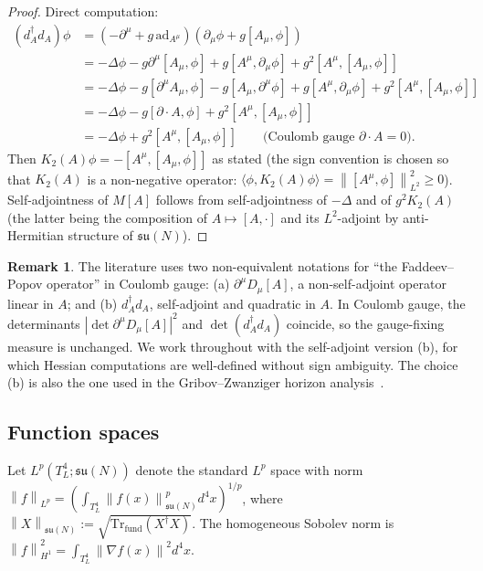 \documentclass[11pt,a4paper]{amsart}
\theoremstyle{definition}
\newtheorem{remark}[theorem]{Remark}
\newcommand{\su}{\mathfrak{su}}
\newcommand{\norm}[1]{\left\lVert#1\right\rVert}
\newcommand{\abs}[1]{\left\lvert#1\right\rvert}
\newcommand{\Tr}{\mathrm{Tr}}
\newcommand{\ad}{\mathrm{ad}}
\begin{document}
\begin{proof}
Direct computation:
\begin{align*}
(d_A^\dagger d_A)\phi &= (-\partial^\mu + g\,\ad_{A^\mu})(\partial_\mu \phi + g[A_\mu, \phi]) \\
&= -\Delta \phi - g \partial^\mu[A_\mu, \phi] + g[A^\mu, \partial_\mu\phi] + g^2 [A^\mu, [A_\mu, \phi]] \\
&= -\Delta \phi - g[\partial^\mu A_\mu, \phi] - g[A_\mu, \partial^\mu \phi] + g[A^\mu, \partial_\mu \phi] + g^2[A^\mu, [A_\mu, \phi]] \\
&= -\Delta \phi - g[\partial \cdot A, \phi] + g^2[A^\mu, [A_\mu, \phi]] \\
&= -\Delta \phi + g^2[A^\mu, [A_\mu, \phi]] \qquad \text{(Coulomb gauge $\partial \cdot A = 0$).}
\end{align*}
Then $K_2(A)\phi = -[A^\mu, [A_\mu, \phi]]$ as stated (the sign convention is chosen so that
$K_2(A)$ is a non-negative operator: $\langle \phi, K_2(A)\phi\rangle = \norm{[A^\mu, \phi]}^2_{L^2} \geq 0$).
Self-adjointness of $M[A]$ follows from self-adjointness of $-\Delta$ and of
$g^2 K_2(A)$ (the latter being the composition of $A \mapsto [A, \cdot]$ and its
$L^2$-adjoint by anti-Hermitian structure of $\su(N)$).
\end{proof}

\begin{remark}\label{rem:two-FPs}
The literature uses two non-equivalent notations for ``the Faddeev--Popov
operator'' in Coulomb gauge: (a) $\partial^\mu D_\mu[A]$, a non-self-adjoint
operator linear in $A$; and (b) $d_A^\dagger d_A$, self-adjoint and quadratic in $A$.
In Coulomb gauge, the determinants $\abs{\det \partial^\mu D_\mu[A]}^2$ and
$\det(d_A^\dagger d_A)$ coincide, so the gauge-fixing measure is unchanged.
We work throughout with the self-adjoint version (b), for which Hessian computations
are well-defined without sign ambiguity. The choice (b) is also the one used in
the Gribov--Zwanziger horizon analysis~\cite{Zwanziger1989}.
\end{remark}

\subsection{Function spaces}\label{ssec:spaces}

Let $L^p(T^4_L; \su(N))$ denote the standard $L^p$ space with norm
$\norm{f}_{L^p} = (\int_{T^4_L} \norm{f(x)}^p_{\su(N)} d^4 x)^{1/p}$,
where $\norm{X}_{\su(N)} := \sqrt{\Tr_{\mathrm{fund}}(X^\dagger X)}$. The
homogeneous Sobolev norm is $\norm{f}_{H^1}^2 = \int_{T^4_L} \norm{\nabla f(x)}^2 d^4 x$.
\end{document}
